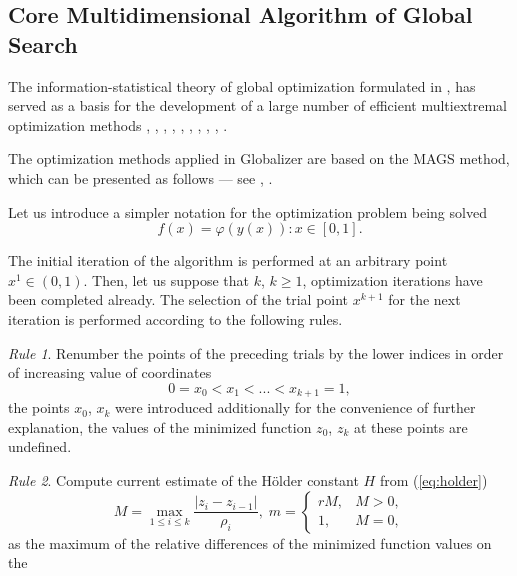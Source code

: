 \documentclass{aims}
\theoremstyle{definition}
\begin{document}
\subsection{Core Multidimensional Algorithm of Global Search}
\label{subsec:corepar}
The information-statistical theory of global optimization formulated in \cite{strongin1978}, \cite{strSergGO} has
served as a basis for the development of a large number of efficient multiextremal optimization
methods \cite{barkalovGergel2014}, \cite{gergel1996}, \cite{gergel1997}, \cite{grishaginStrongin1984}, \cite{Pizzuti}, \cite{sergeyev1995}, \cite{sergeyev1999}, \cite{sergeyevGrishagin2001}, \cite{sergeyevStronginLera2013}, \cite{Famularo2001}.
\par
The optimization methods applied in Globalizer are based on the MAGS method, which can be presented as follows --- see \cite{strongin1978}, \cite{strSergGO}.
\par
Let us introduce a simpler notation for the optimization problem being solved
\begin{equation}
\label{eq:oneDimFunc}
f(x) = \varphi(y(x)):x\in [0,1].
\end{equation}
\par
The initial iteration of the algorithm is performed at an arbitrary point \mbox{\(x^1\in(0,1)\)}.
Then, let us suppose that \(k\), \(k\ge 1\), optimization iterations have been completed already.
The selection of the trial point \(x^{k+1}\) for the next iteration is performed according to the following rules.
\par
\textit{Rule 1}. Renumber the points of the preceding trials by the lower indices in order of increasing value of coordinates
\begin{equation}
  \label{step1}
0=x_0<x_1<...<x_{k+1}=1,
\end{equation}
the points \(x_0\), \(x_k\) were introduced additionally for the convenience of further
explanation, the values of the minimized function \(z_0\), \(z_k\) at these points are undefined.
\par
\textit{Rule 2}. Compute current estimate of the H{\"o}lder constant \(H\) from (\ref{eq:holder})
\begin{equation} \label{step2}
M=\max_{1\leq i\leq k}\frac{|z_i-z_{i-1}|}{\rho_i}, \;
m = \left\{
   \begin{array}{lr}
     rM, & M > 0,\\
     1, & M = 0,
   \end{array}
  \right.
\end{equation}
as the maximum of the relative differences of the minimized function values on the
\end{document}
